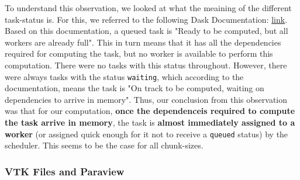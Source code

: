 \documentclass[a4paper,12pt]{article}
\begin{document}
\begin{itemize}
To understand this observation, we looked at what the meaining of the different task-status is. For this, we referred to the following Dask Documentation: \href{https://distributed.dask.org/en/stable/scheduling-state.html#task-state}{link}. Based on this documentation, a queued task is "Ready to be computed, but all workers are already full". This in turn means that it has all the dependencies required for computing the task, but no worker is available to perform this computation. There were no tasks with this status throughout. However, there were always tasks with the status \verb|waiting|, which according to the documentation, means the task is "On track to be computed, waiting on dependencies to arrive in memory". Thus, our conclusion from this observation was that for our computation, \textbf{once the dependenceis required to compute the task arrive in memory}, the task is \textbf{almost immediately assigned to a worker} (or assigned quick enough for it not to receive a \verb|queued| status) by the scheduler. This seems to be the case for all chunk-sizes.

\end{itemize}

\subsubsection{VTK Files and Paraview}



\end{document}
